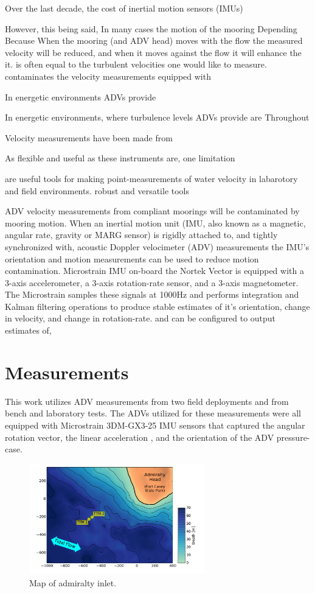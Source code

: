 \documentclass[twocol]{ametsoc}
\begin{document}
Over the last decade, the cost of inertial motion sensors (IMUs)

However, this being said,  In many cases the motion of the mooring Depending Because When the mooring (and ADV head) moves with the flow the measured velocity will be reduced, and when it moves against the flow it will enhance the it. is often equal to the turbulent velocities one would like to measure. contaminates the velocity measurements  equipped with 

In energetic environments ADVs provide 

In energetic environments, where turbulence levels ADVs provide are Throughout 

Velocity measurements have been made from 

As flexible and useful as these instruments are, one limitation 

are useful tools for making point-measurements of water velocity in labarotory and field environments. 
robust and versatile tools 

  ADV velocity measurements from compliant moorings will be contaminated by mooring motion. When an inertial motion unit (IMU, also known as a magnetic, angular rate, gravity or MARG sensor) is rigidly attached to, and tightly synchronized with, acoustic Doppler velocimeter (ADV) measurements the IMU's orientation and motion measurements can be used to reduce motion contamination.  Microstrain IMU on-board the Nortek Vector is equipped with a 3-axis accelerometer, a 3-axis rotation-rate sensor, and a 3-axis magnetometer.  The Microstrain samples these signals at 1000Hz and performs integration and Kalman filtering operations to produce stable estimates of it's orientation, change in velocity, and change in rotation-rate.  and  can be configured to output estimates of,

\section{Measurements}

This work utilizes ADV measurements from two field deployments and from bench and laboratory tests. The ADVs utilized for these measurements were all equipped with Microstrain 3DM-GX3-25 IMU sensors that captured the angular rotation vector, the linear acceleration , and the orientation of the ADV pressure-case.  

\begin{figure}[t]
  \centering
  \includegraphics[width=3in]{map02}
  \caption{Map of admiralty inlet.}
  \label{fig:map}
\end{figure}
\end{document}
